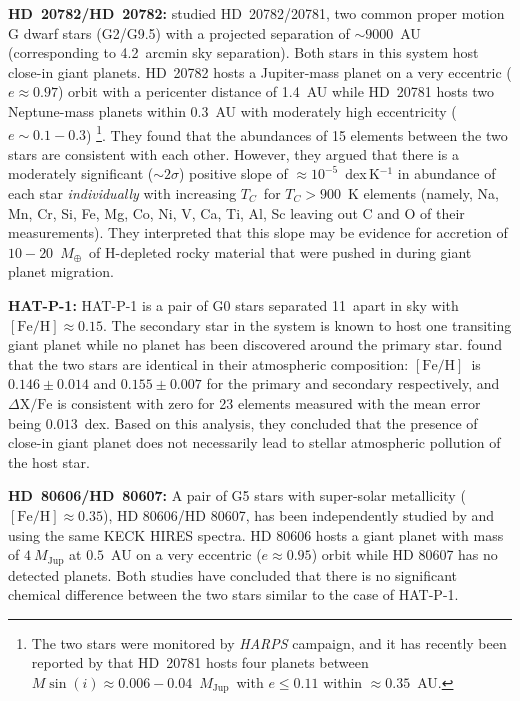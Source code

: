 \documentclass[manuscript]{aastex6}
\newcommand{\project}[1]{\textsl{#1}}
\newcommand*\elem[1]{\ensuremath{\mathrm{#1}}}
\newcommand*\elemH[1]{\ensuremath{[\mathrm{#1}/\elem{H}]}}
\newcommand*{\feh}{\ensuremath{\elemH{Fe}}}
\newcommand{\Tcondens}{\ensuremath{T_C}}
\newcommand{\mearth}{\ensuremath{M_\oplus}}
\newcommand{\mjupiter}{\ensuremath{M_\mathrm{Jup}}}
\begin{document}
{\bf HD~20782/HD~20782:} 
\citealt{Mack:2014aa} studied HD~20782/20781, two common proper motion G dwarf
stars (G2/G9.5) with a projected separation of $\sim9000$~AU (corresponding to
4.2~arcmin sky separation). Both stars in this system host close-in giant
planets.
HD~20782 hosts a Jupiter-mass planet on a very eccentric ($e\approx 0.97$)
orbit with a pericenter distance of 1.4~AU while HD~20781 hosts two
Neptune-mass planets within 0.3~AU with moderately high eccentricity
($e\sim0.1-0.3$) \footnote{
  The two stars were monitored by \project{HARPS}
  campaign, and it has recently been reported by \citealt{} that HD~20781 hosts
  four planets between $M\sin(i)\approx 0.006-0.04$~\mjupiter\ with $e \le
  0.11$ within $\approx 0.35$~AU.}.
They found that the abundances of 15 elements between the two stars are
consistent with each other.
However, they argued that there is a moderately significant ($\sim 2\sigma$)
positive slope of $\approx 10^{-5}$~dex\,K$^{-1}$ in abundance of each star
{\it individually} with increasing \Tcondens\ for $\Tcondens>900$~K elements
(namely, Na, Mn, Cr, Si, Fe, Mg, Co, Ni, V, Ca, Ti, Al, Sc leaving out C and O
of their measurements).
They interpreted that this slope may be evidence for accretion of
$10-20$~\mearth\ of H-depleted rocky material that were pushed in during giant
planet migration.

{\bf HAT-P-1:}
HAT-P-1 is a pair of G0 stars separated 11\arcsec\ apart in sky
with $\feh\approx0.15$.
The secondary star in the system is known to host one transiting giant planet
while no planet has been discovered around the primary star.
\citealt{Liu:2014aa} found that the two stars are identical in their
atmospheric composition: \feh\ is $0.146 \pm 0.014$ and $0.155 \pm 0.007$ for
the primary and secondary respectively, and $\Delta\elem{X}/\elem{Fe}$ is
consistent with zero for 23 elements measured with the mean error being
$0.013$~dex.
Based on this analysis, they concluded that the presence of close-in giant planet
does not necessarily lead to stellar atmospheric pollution of the host star.

{\bf HD~80606/HD~80607:}
A pair of G5 stars with super-solar metallicity ($\feh \approx 0.35$),
HD 80606/HD 80607, has been independently studied by
\citealt{Saffe:2015aa} and \citealt{Mack:2016aa} using the same KECK HIRES
spectra. HD 80606 hosts a giant planet with mass of $4~\mjupiter$ at $0.5$~AU
on a very eccentric ($e\approx0.95$) orbit while HD 80607 has no detected
planets.
Both studies have concluded that there is no significant
chemical difference between the two stars similar to the case of HAT-P-1.
\end{document}
